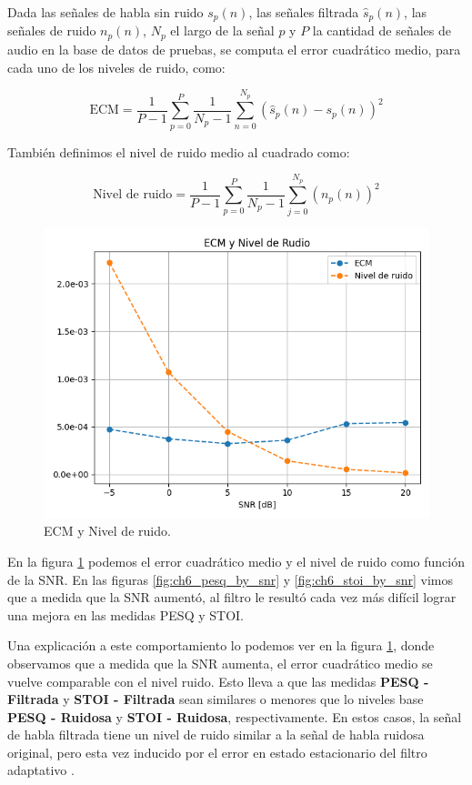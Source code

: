 Dada las señales de habla sin ruido $s_p(n)$, las señales filtrada $\hat{s}_p(n)$, las señales de ruido $n_p(n)$, $N_p$ el largo de la señal $p$ y $P$ la cantidad de señales de audio en la base de datos de pruebas, se computa el error cuadrático medio, para cada uno de los niveles de ruido, como:

\begin{equation*}
	\text{ECM} = \frac{1}{P-1} \sum_{p=0}^{P} \frac{1}{N_p-1} \sum_{n=0}^{N_p} (\hat{s}_p(n) - s_p(n))^2
\end{equation*}

También definimos el nivel de ruido medio al cuadrado como:

\begin{equation*}
	\text{Nivel de ruido} = \frac{1}{P-1} \sum_{p=0}^{P} \frac{1}{N_p-1} \sum_{j=0}^{N_p} (n_p(n))^2
\end{equation*}

\begin{figure}
	\centering
	\centerline{\includegraphics[scale=0.8]{images/ch6/ecm_and_noise_level.png}}
	\caption{ECM y Nivel de ruido.}
	\label{fig:ch6_mse_and_noise_level}
\end{figure}

En la figura \ref{fig:ch6_mse_and_noise_level} podemos el error cuadrático medio y el nivel de ruido como función de la SNR. En las figuras \ref{fig:ch6_pesq_by_snr} y \ref{fig:ch6_stoi_by_snr} vimos que a medida que la SNR aumentó, al filtro le resultó cada vez más difícil lograr una mejora en las medidas PESQ y STOI. 

Una explicación a este comportamiento lo podemos ver en la figura \ref{fig:ch6_mse_and_noise_level}, donde observamos que a medida que la SNR aumenta, el error cuadrático medio se vuelve comparable con el nivel ruido. Esto lleva a que las medidas  \textbf{PESQ - Filtrada} y \textbf{STOI - Filtrada} sean similares o menores que lo niveles base \textbf{PESQ - Ruidosa} y \textbf{STOI - Ruidosa}, respectivamente. En estos casos, la señal de habla filtrada tiene un nivel de ruido similar a la señal de habla ruidosa original, pero esta vez inducido por el error en estado estacionario del filtro adaptativo \cite{fundamentals_of_adaptive_filtering}.

